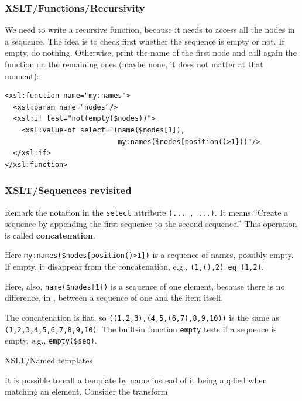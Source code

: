 %
\begin{frame}[containsverbatim]
\frametitle{XSLT/Functions/Recursivity}

We need to write a recursive function, because it needs to access all
the nodes in a sequence. The idea is to check first whether the
sequence is empty or not. If empty, do nothing. Otherwise, print the
name of the first node and call again the function on the remaining
ones (maybe none, it does not matter at that moment):
{\small
\begin{verbatim}
<xsl:function name="my:names">
  <xsl:param name="nodes"/>
  <xsl:if test="not(empty($nodes))">
    <xsl:value-of select="(name($nodes[1]),
                           my:names($nodes[position()>1]))"/>
  </xsl:if>
</xsl:function>
\end{verbatim}
}

\end{frame}

%
\begin{frame}[containsverbatim]
\frametitle{XSLT/Sequences revisited}

Remark the notation in the \texttt{select} attribute
\verb|(... , ...)|. It means ``Create a sequence by appending the
first sequence to the second sequence.'' This operation is called
\textbf{concatenation}.

\bigskip

Here \verb|my:names($nodes[position()>1])| is a sequence of names,
possibly empty. If empty, it disappear from the concatenation, e.g.,
\verb|(1,(),2) eq (1,2)|.

\bigskip

Here, also, \verb|name($nodes[1])| is a sequence of one element,
because there is no difference, in \XSLT, between a sequence of one
and the item itself.

\bigskip

The concatenation is flat, so \verb|((1,2,3),(4,5,(6,7),8,9,10))| is
the same as \verb|(1,2,3,4,5,6,7,8,9,10)|. The built-in function
\texttt{empty} tests if a sequence is empty, e.g., \verb|empty($seq)|.

\end{frame}

%
\begin{frame}{XSLT/Named templates}

It is possible to call a template by name instead of it being applied
when matching an element.
Consider the transform

\end{frame}

